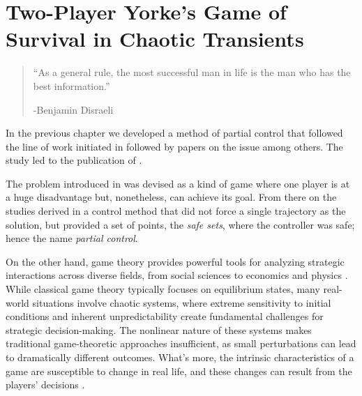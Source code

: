 \chapter{Two-Player Yorke's Game of Survival in Chaotic Transients} %
\label{chap:PartialControlGame}


\begin{quotation}

	\vspace{-3cm}
	\begin{flushright}
    \begin{minipage}[t][5cm][b]{0.5\textwidth}
    { ``As a general rule, the most successful man in life is the man who has the best information.''}
    
    \bigskip
    
    -{\small  Benjamin Disraeli}
    \end{minipage}
    \end{flushright}



    \vspace{0.5cm}

\end{quotation}




In the previous chapter we developed a method of partial control that followed the line of work initiated in \cite{Yorke} followed by papers on the issue \cite{DynamicsPartialControl,PartialControlBeyond,PartialControlFunctions} among others. The study led to the publication of \cite{PartialControlEscape}. 

The problem introduced in \cite{Yorke} was devised as a kind of game where one player is at a huge disadvantage but, nonetheless, can achieve its goal. From there on the studies derived in a control method that did not force a single trajectory as the solution, but provided a set of points, the \textit{safe sets}, where the controller was safe; hence the name \textit{partial control}.

On the other hand, game theory provides powerful tools for analyzing strategic interactions across diverse fields, from social sciences to economics and physics \cite{Social,EconomyGames,GamesComplex}. While classical game theory typically focuses on equilibrium states, many real-world situations involve chaotic systems, where extreme sensitivity to initial conditions and inherent unpredictability create fundamental challenges for strategic decision-making. The nonlinear nature of these systems makes traditional game-theoretic approaches insufficient, as small perturbations can lead to dramatically different outcomes. What's more, the intrinsic characteristics of a game are susceptible to change in real life, and these changes can result from the players' decisions \cite{AkiyamaKaneko1,AkiyamaKaneko2}.

